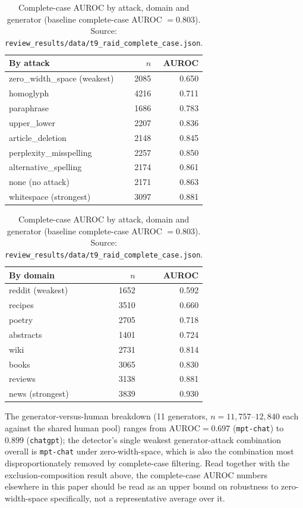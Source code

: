 \documentclass{article}
\begin{document}
\begin{table}[h]
\centering
\footnotesize
\caption{Complete-case AUROC by attack, domain and generator (baseline
complete-case AUROC $=0.803$). Source: \texttt{review\_results/data/t9\_raid\_complete\_case.json}.}
\label{tab:raidcompletecase}
\begin{tabular}{lrr}
\toprule
By attack & $n$ & AUROC \\
\midrule
zero\_width\_space (weakest) & 2085 & 0.650 \\
homoglyph                    & 4216 & 0.711 \\
paraphrase                   & 1686 & 0.783 \\
upper\_lower                 & 2207 & 0.836 \\
article\_deletion             & 2148 & 0.845 \\
perplexity\_misspelling      & 2257 & 0.850 \\
alternative\_spelling         & 2174 & 0.861 \\
none (no attack)             & 2171 & 0.863 \\
whitespace (strongest)       & 3097 & 0.881 \\
\bottomrule
\end{tabular}
\quad
\begin{tabular}{lrr}
\toprule
By domain & $n$ & AUROC \\
\midrule
reddit (weakest)  & 1652 & 0.592 \\
recipes           & 3510 & 0.660 \\
poetry            & 2705 & 0.718 \\
abstracts         & 1401 & 0.724 \\
wiki              & 2731 & 0.814 \\
books             & 3065 & 0.830 \\
reviews           & 3138 & 0.881 \\
news (strongest)  & 3839 & 0.930 \\
\bottomrule
\end{tabular}
\end{table}

The generator-versus-human breakdown (11 generators, $n=11{,}757$--$12{,}840$ each
against the shared human pool) ranges from $\text{AUROC}=0.697$ (\texttt{mpt-chat})
to $0.899$ (\texttt{chatgpt}); the detector's single weakest generator-attack
combination overall is \texttt{mpt-chat} under zero-width-space, which is also the
combination most disproportionately removed by complete-case filtering. Read
together with the exclusion-composition result above, the complete-case AUROC
numbers elsewhere in this paper should be read as an upper bound on robustness to
zero-width-space specifically, not a representative average over it.
\end{document}
